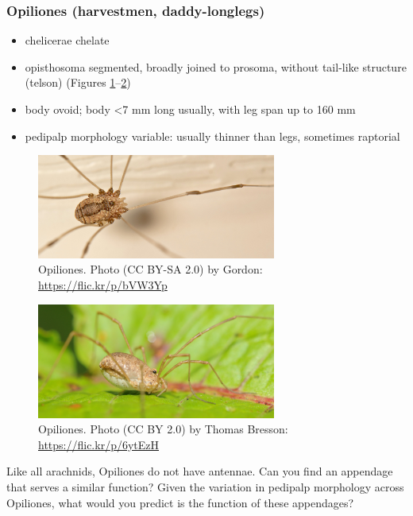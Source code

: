 \documentclass[letterpaper, 11pt]{article}
\begin{document}
\subsubsection*{Opiliones (harvestmen, daddy-longlegs)}
\begin{itemize}
\item chelicerae chelate
\item opisthosoma segmented, broadly joined to prosoma, without tail-like structure (telson) (Figures \ref{fig:opiliones1}--\ref{fig:opiliones2})
\item body ovoid; body  \textless7 mm long usually, with leg span up to 160 mm
\item pedipalp morphology variable: usually thinner than legs, sometimes raptorial 
\end{itemize}

\begin{figure}[ht!]
  \centering
    \includegraphics[width=0.7\textwidth]{opiliones1}
  \caption{Opiliones. Photo (CC BY-SA 2.0) by Gordon: \url{https://flic.kr/p/bVW3Yp}}
  \label{fig:opiliones1}
\end{figure}

\begin{figure}[ht!]
  \centering
    \includegraphics[width=0.7\textwidth]{opiliones2}
  \caption{Opiliones. Photo (CC BY 2.0) by Thomas Bresson: \url{https://flic.kr/p/6ytEzH}}
  \label{fig:opiliones2}
\end{figure}
\noindent{}Like all arachnids, Opiliones do not have antennae. Can you find an appendage that serves a similar function? Given the variation in pedipalp morphology across Opiliones, what would you predict is the function of these appendages?\vspace{3cm}
\end{document}
